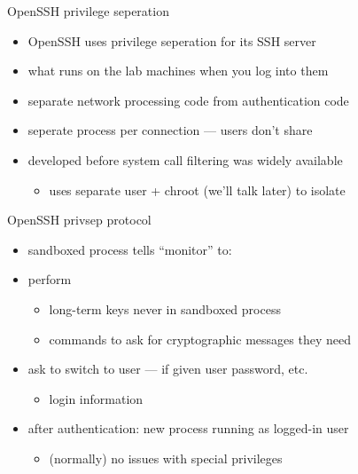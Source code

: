 \begin{frame}{OpenSSH privilege seperation}
    \begin{itemize}
    \item OpenSSH uses privilege seperation for its SSH server
    \item what runs on the lab machines when you log into them
    \vspace{.5cm}
    \item separate network processing code from authentication code
    \item seperate process per connection --- users don't share
    \vspace{.5cm}
    \item developed before system call filtering was widely available
        \begin{itemize}
        \item uses separate user + chroot (we'll talk later) to isolate
        \end{itemize}
    \end{itemize}
\end{frame}

\begin{frame}{OpenSSH privsep protocol}
    \begin{itemize}
    \item sandboxed process tells ``monitor'' to:
        \vspace{.25cm}
    \item perform 
        \begin{itemize}
        \item long-term keys never in sandboxed process
        \item commands to ask for cryptographic messages they need
        \end{itemize}
    \item ask to switch to user --- if given user password, etc.
        \begin{itemize}
            \item {} login information
        \end{itemize}
    \item after authentication: new process running as logged-in user 
        \begin{itemize}
            \item (normally) no issues with special privileges
        \end{itemize}
    \end{itemize}
\end{frame}


